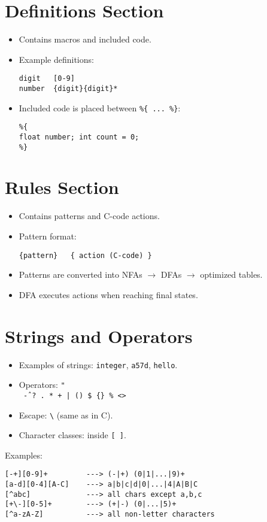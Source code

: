 \documentclass[12pt,a4paper]{article}
\begin{document}
\section*{Definitions Section}
\begin{itemize}
    \item Contains macros and included code.
    \item Example definitions:
\begin{verbatim}
digit   [0-9]
number  {digit}{digit}*
\end{verbatim}
    \item Included code is placed between \texttt{\%\{ ... \%\}}:
\begin{verbatim}
%{
float number; int count = 0;
%}
\end{verbatim}
\end{itemize}

\section*{Rules Section}
\begin{itemize}
    \item Contains patterns and C-code actions.
    \item Pattern format:
\begin{verbatim}
{pattern}   { action (C-code) }
\end{verbatim}
    \item Patterns are converted into NFAs $\to$ DFAs $\to$ optimized tables.
    \item DFA executes actions when reaching final states.
\end{itemize}

\section*{Strings and Operators}
\begin{itemize}
    \item Examples of strings: \texttt{integer}, \texttt{a57d}, \texttt{hello}.
    \item Operators: \texttt{" \ \[\] \^ - ? . * + | () \$ \{\} \% <>}
    \item Escape: \texttt{\textbackslash} (same as in C).
    \item Character classes: inside \texttt{[ ]}.
\end{itemize}

Examples:
\begin{verbatim}
[-+][0-9]+         ---> (-|+) (0|1|...|9)+
[a-d][0-4][A-C]    ---> a|b|c|d|0|...|4|A|B|C
[^abc]             ---> all chars except a,b,c
[+\-][0-5]+        ---> (+|-) (0|...|5)+
[^a-zA-Z]          ---> all non-letter characters
\end{verbatim}
\end{document}
